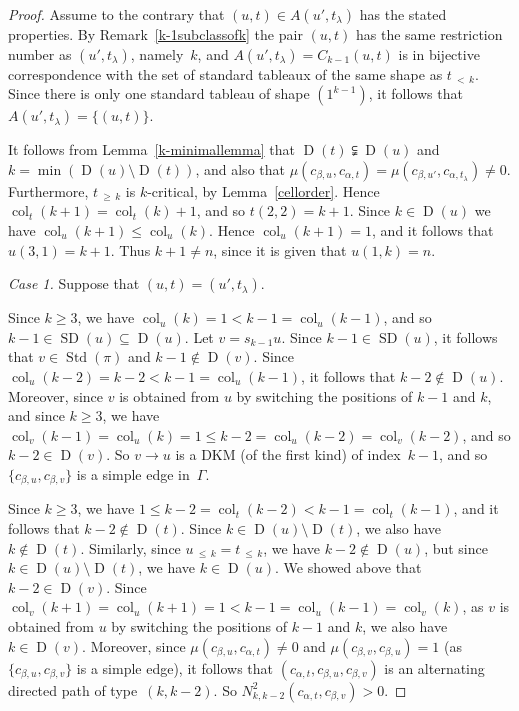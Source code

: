 \documentclass[ALCO,ThmDefs,Unicode,epreuves]{cedram}
\newenvironment{Case}[1]{\smallskip\noindent\emph{Case #1}\endgraf
 \nobreak\noindent\ignorespaces}{\endgraf\smallskip}
\DeclareMathOperator{\col}{col}
\newcommand{\lessthan}[2]{#1\,{_{<\,#2}}}
\newcommand{\Lessthan}[2]{#1\,{_{\leqslant\,#2}}}
\newcommand{\Morethan}[2]{#1\,{_{\geqslant\,#2}}}
\DeclareMathOperator{\STD}{Std}
\DeclareMathOperator{\SD}{SD}
\DeclareMathOperator{\D}{D}
\begin{document}
\begin{proof}
Assume to the contrary that $(u,t)\in A(u',t_\lambda)$ has the stated properties.
By Remark~\ref{k-1subclassofk} the pair $(u,t)$ has the same restriction number
as $(u',t_\lambda)$, namely~$k$, and $A(u',t_\lambda)=C_{k-1}(u,t)$ is in bijective
correspondence with the set of standard tableaux of the same shape as $\lessthan tk$.
Since there is only one standard tableau of shape $(1^{k-1})$, it follows that
$A(u',t_\lambda)=\{(u,t)\}$.

It follows from Lemma~\ref{k-minimallemma} that $\D(t)\subsetneqq\D(u)$ and
$k=\min(\D(u)\setminus\D(t))$, and also that
$\mu(c_{\beta,u},c_{\alpha,t})=\mu(c_{\beta,u'},c_{\alpha,t_\lambda})\neq 0$. Furthermore,
$\Morethan tk$ is $k$-critical, by Lemma~\ref{cellorder}.
Hence $\col_t(k+1)=\col_t(k)+1$, and so $t(2,2)=k+1$. Since
$k\in\D(u)$ we have $\col_u(k+1)\leqslant\col_u(k)$. Hence $\col_u(k+1)=1$,
and it follows that $u(3,1)=k+1$. Thus $k+1\ne n$, since it is given that
$u(1,k)=n$.

\begin{Case}{1.} Suppose that $(u,t)=(u',t_\lambda)$.

Since $k\geqslant 3$, we have
$\col_u(k)=1<k-1=\col_u(k-1)$, and so
$k-1\in\SD(u)\subseteq\D(u)$. Let $v=s_{k-1}u$. Since
$k-1\in\SD(u)$, it follows that
$v\in\STD(\pi)$ and $k-1\notin\D(v)$.
Since $\col_u(k-2)=k-2<k-1=\col_u(k-1)$, it follows that
$k-2\notin\D(u)$. Moreover,
since $v$ is obtained from $u$ by switching the positions of $k-1$ and $k$,
and since $k\geqslant 3$, we have
$\col_v(k-1)=\col_u(k)=1\leqslant k-2=\col_u(k-2)=\col_v(k-2)$,
and so $k-2\in\D(v)$. So $v\to u$ is a DKM
(of the first kind) of index~$k-1$, and so
$\{c_{\beta,u},c_{\beta,v}\}$ is a simple edge in~$\Gamma$.

Since $k\geqslant 3$, we have $1\leqslant k-2=\col_t(k-2)<k-1=\col_t(k-1)$,
and it follows that $k-2\notin\D(t)$. Since $k\in\D(u)\setminus\D(t)$, we
also have $k\notin\D(t)$. Similarly, since $\Lessthan uk = \Lessthan tk$,
we have $k-2\notin\D(u)$, but since
$k\in\D(u)\setminus\D(t)$, we have $k\in\D(u)$.
We showed above that $k-2\in\D(v)$. Since
$\col_v(k+1)=\col_u(k+1)=1<k-1=\col_u(k-1)=\col_v(k)$, as
$v$ is obtained from $u$ by switching the positions of $k-1$ and $k$,
we also have $k\in\D(v)$.
Moreover, since $\mu(c_{\beta,u},c_{\alpha,t})\neq 0$ and
$\mu(c_{\beta,v},c_{\beta,u})=1$ (as
$\{c_{\beta,u},c_{\beta,v}\}$ is a simple edge),
it follows that $(c_{\alpha,t},c_{\beta,u},c_{\beta,v})$ is
an alternating directed path of type~$(k,k-2)$.
So $N^{2}_{k,k-2}(c_{\alpha,t},c_{\beta,v})>0$.


\end{Case}
\end{proof}
\end{document}
